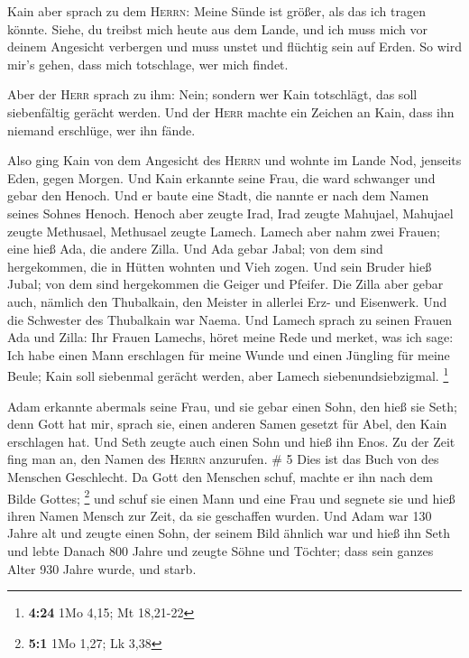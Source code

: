  Kain aber sprach zu dem \textsc{Herrn}: Meine Sünde ist
größer, als das ich tragen könnte.  Siehe, du treibst
mich heute aus dem Lande, und ich muss mich vor deinem Angesicht
verbergen und muss unstet und flüchtig sein auf Erden. So wird mir's
gehen, dass mich totschlage, wer mich findet.

 Aber der \textsc{Herr} sprach zu ihm: Nein; sondern wer
Kain totschlägt, das soll siebenfältig gerächt werden. Und der
\textsc{Herr} machte ein Zeichen an Kain, dass ihn niemand erschlüge,
wer ihn fände.

 Also ging Kain von dem Angesicht des \textsc{Herrn} und
wohnte im Lande Nod, jenseits Eden, gegen Morgen.  Und
Kain erkannte seine Frau, die ward schwanger und gebar den Henoch. Und
er baute eine Stadt, die nannte er nach dem Namen seines Sohnes Henoch.
 Henoch aber zeugte Irad, Irad zeugte Mahujael, Mahujael
zeugte Methusael, Methusael zeugte Lamech.  Lamech aber
nahm zwei Frauen; eine hieß Ada, die andere Zilla.  Und
Ada gebar Jabal; von dem sind hergekommen, die in Hütten wohnten und
Vieh zogen.  Und sein Bruder hieß Jubal; von dem sind
hergekommen die Geiger und Pfeifer.  Die Zilla aber gebar
auch, nämlich den Thubalkain, den Meister in allerlei Erz- und
Eisenwerk. Und die Schwester des Thubalkain war Naema. 
Und Lamech sprach zu seinen Frauen Ada und Zilla: Ihr Frauen Lamechs,
höret meine Rede und merket, was ich sage: Ich habe einen Mann
erschlagen für meine Wunde und einen Jüngling für meine Beule;
 Kain soll siebenmal gerächt werden, aber Lamech
siebenundsiebzigmal. \footnote{\textbf{4:24} 1Mo 4,15; Mt 18,21-22}

 Adam erkannte abermals seine Frau, und sie gebar einen
Sohn, den hieß sie Seth; denn Gott hat mir, sprach sie, einen anderen
Samen gesetzt für Abel, den Kain erschlagen hat.  Und
Seth zeugte auch einen Sohn und hieß ihn Enos. Zu der Zeit fing man an,
den Namen des \textsc{Herrn} anzurufen. \# 5  Dies ist das
Buch von des Menschen Geschlecht. Da Gott den Menschen schuf, machte er
ihn nach dem Bilde Gottes; \footnote{\textbf{5:1} 1Mo 1,27; Lk 3,38}
 und schuf sie einen Mann und eine Frau und segnete sie
und hieß ihren Namen Mensch zur Zeit, da sie geschaffen wurden.
 Und Adam war 130 Jahre alt und zeugte einen Sohn, der
seinem Bild ähnlich war und hieß ihn Seth  und lebte
Danach 800 Jahre und zeugte Söhne und Töchter;  dass sein
ganzes Alter 930 Jahre wurde, und starb.

